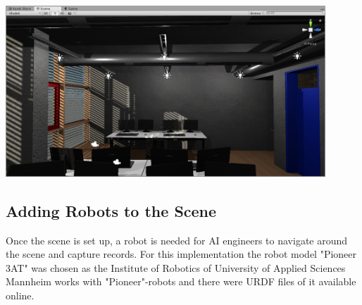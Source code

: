 \begin{center}%
    \noindent
    \includegraphics[width=12cm]{img/ch05/UnitySceneA205_02.png}
    \label{fig:unity-scene-a205}
\end{center}

\subsection{Adding Robots to the Scene}
Once the scene is set up, a robot is needed for \acs{AI} engineers to navigate around the scene and capture records. For this implementation the robot model "Pioneer 3AT" was chosen as the Institute of Robotics of University of Applied Sciences Mannheim works with "Pioneer"-robots and there were \ac{URDF} files of it available \cite{AmrRosConfig} online.

